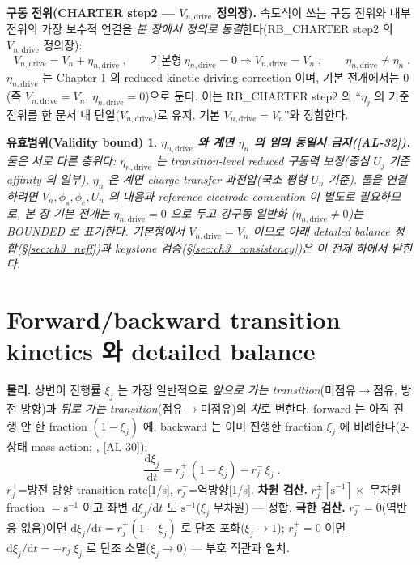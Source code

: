 \documentclass[11pt,a4paper]{article}
\newtheorem*{boundbox}{유효범위(Validity bound)}
\newcommand{\dd}{\mathrm{d}}
\newcommand{\drive}{\mathrm{drive}}
\newcommand{\AL}[1]{\textsf{[AL-#1]}}
\begin{document}
\textbf{구동 전위(CHARTER step2 — $V_{n,\drive}$ 정의장).} 속도식이 쓰는 구동 전위와 내부 전위의 가장 보수적
연결을 \emph{본 장에서 정의로 동결}한다(RB\_CHARTER step2 의 $V_{n,\drive}$ 정의장):
\begin{equation}
\boxed{\;V_{n,\drive}=V_n+\eta_{n,\drive}\;,\qquad \text{기본형}\ \eta_{n,\drive}=0\Rightarrow V_{n,\drive}=V_n\;,\qquad \eta_{n,\drive}\ne\eta_n\;.}
\label{eq:ch3_drive}
\end{equation}
$\eta_{n,\drive}$ 는 Chapter 1 의 reduced kinetic driving correction 이며, 기본 전개에서는 $0$(즉
$V_{n,\drive}=V_n$, $\eta_{n,\drive}=0$)으로 둔다. 이는 RB\_CHARTER step2 의 ``$\eta_j$ 의 기준 전위를 한
문서 내 단일($V_{n,\drive}$)로 유지, 기본 $V_{n,\drive}=V_n$''와 정합한다.
\begin{boundbox}
\textbf{$\eta_{n,\drive}$ 와 계면 $\eta_n$ 의 임의 동일시 금지(\AL{32}).} 둘은 \emph{서로 다른 층위}다:
$\eta_{n,\drive}$ 는 transition-level reduced 구동력 보정(중심 $U_j$ 기준 affinity 의 일부), $\eta_n$ 은
계면 charge-transfer 과전압(국소 평형 $U_n$ 기준). 둘을 연결하려면 $V_n,\phi_s,\phi_e,U_n$ 의 대응과 reference
electrode convention 이 별도로 필요하므로, 본 장 기본 전개는 $\eta_{n,\drive}=0$ 으로 두고 강구동 일반화
($\eta_{n,\drive}\ne0$)는 BOUNDED 로 표기한다. 기본형에서 $V_{n,\drive}=V_n$ 이므로 아래 detailed balance
정합(\S\ref{sec:ch3_neff})과 keystone 검증(\S\ref{sec:ch3_consistency})은 \emph{이 전제 하에서} 닫힌다.
\end{boundbox}

\section{Forward/backward transition kinetics 와 detailed balance}\label{sec:ch3_db}
\textbf{물리.} 상변이 진행률 $\xi_j$ 는 가장 일반적으로 \emph{앞으로 가는 transition}(미점유$\to$점유, 방전
방향)과 \emph{뒤로 가는 transition}(점유$\to$미점유)의 \emph{차}로 변한다. forward 는 아직 진행 안 한 fraction
$(1-\xi_j)$ 에, backward 는 이미 진행한 fraction $\xi_j$ 에 비례한다(2-상태 mass-action; \cite{eyring1935,degrootmazur1962},
\AL{30}):
\begin{equation}
\boxed{\;\frac{\dd\xi_j}{\dd t}=r_j^+\,(1-\xi_j)-r_j^-\,\xi_j\;.}
\label{eq:ch3_fb}
\end{equation}
$r_j^+$=방전 방향 transition rate[1/s], $r_j^-$=역방향[1/s]. \textbf{차원 검산.} $r_j^\pm[\mathrm{s^{-1}}]\times$
무차원 fraction $=\mathrm{s^{-1}}$ 이고 좌변 $\dd\xi_j/\dd t$ 도 $\mathrm{s^{-1}}$($\xi_j$ 무차원) — 정합.
\textbf{극한 검산.} $r_j^-=0$(역반응 없음)이면 $\dd\xi_j/\dd t=r_j^+(1-\xi_j)$ 로 단조 포화($\xi_j\to1$);
$r_j^+=0$ 이면 $\dd\xi_j/\dd t=-r_j^-\xi_j$ 로 단조 소멸($\xi_j\to0$) — 부호 직관과 일치.
\end{document}
